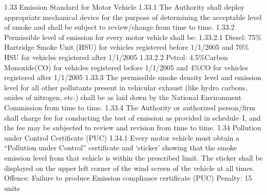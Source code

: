 \documentclass[
]{book}
\begin{document}
1.33 Emission Standard for Motor Vehicle
1.33.1 The Authority shall deploy appropriate mechanical device for the purpose of determining the acceptable level of smoke and shall be subject to review/change from time to time.
1.33.2 Permissible level of emission for every motor vehicle shall be:
1.33.2.1 Diesel: 75\% Hartridge Smoke Unit (HSU) for vehicles registered before 1/1/2005 and 70\% HSU for vehicles registered after 1/1/2005
1.33.2.2 Petrol: 4.5\%Carbon Monoxide(CO) for vehicles registered before 1/1/2005 and 4\%CO for vehicles registered after 1/1/2005
1.33.3 The permissible smoke density level and emission level for all other pollutants present in vehicular exhaust (like hydro carbons, oxides of nitrogen, etc.) shall be as laid down by the National Environment Commission from time to time.
1.33.4 The Authority or authorized person/firm shall charge fee for conducting the test of emission as provided in schedule--I, and the fee may be subjected to review and revision from time to time.
1.34 Pollution under Control Certificate (PUC)
1.34.1 Every motor vehicle must obtain a ``Pollution under Control'' certificate and `sticker' showing that the smoke emission level from that vehicle is within the prescribed limit. The sticker shall be displayed on the upper left corner of the wind screen of the vehicle at all times.
Offence: Failure to produce Emission compliance certificate (PUC)
Penalty: 15 units
\end{document}
